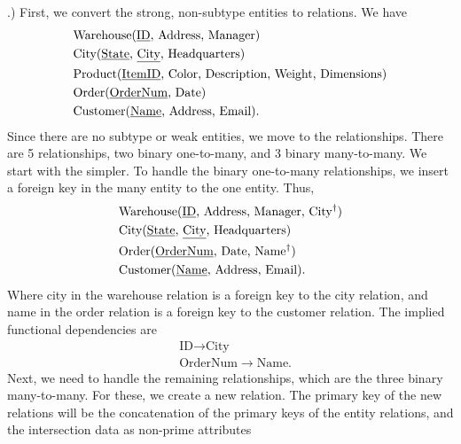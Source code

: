 \documentclass{report}
\begin{document}
    \pagebreak \bigbreak {}.) First, we convert the strong, non-subtype entities to relations. We have
    \begin{align*}
        &\text{Warehouse(\underline{ID}, Address, Manager)} \\
        &\text{City(\underline{State}, \underline{City}, Headquarters)} \\
        &\text{Product(\underline{ItemID}, Color, Description, Weight, Dimensions)} \\
        &\text{Order(\underline{OrderNum}, Date)} \\
        &\text{Customer(\underline{Name}, Address, Email)}
    .\end{align*}
    \bigbreak \noindent 
    Since there are no subtype or weak entities, we move to the relationships. There are 5 relationships, two binary one-to-many, and 3 binary many-to-many. We start with the simpler.
    \bigbreak \noindent 
    To handle the binary one-to-many relationships, we insert a foreign key in the many entity to the one entity. Thus,
    \begin{align*}
         &\text{Warehouse(\underline{ID}, Address, Manager, City$^{\dag}$)} \\
        &\text{City(\underline{State}, \underline{City}, Headquarters)} \\
        &\text{Order(\underline{OrderNum}, Date, Name$^{\dag}$)} \\
        &\text{Customer(\underline{Name}, Address, Email)}
    .\end{align*}
    \bigbreak \noindent 
    Where city in the warehouse relation is a foreign key to the city relation, and name in the order relation is a foreign key to the customer relation. The implied functional dependencies are
    \begin{align*}
        &\text{ID} \to \text{City} \\
        &\text{OrderNum} \to \text{Name}
    .\end{align*}
    \bigbreak \noindent 
    Next, we need to handle the remaining relationships, which are the three binary many-to-many. For these, we create a new relation. The primary key of the new relations will be the concatenation of the primary keys of the entity relations, and the intersection data as non-prime attributes
\end{document}
